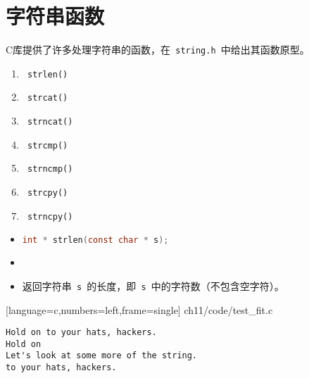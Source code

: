 \section{字符串函数}

\begin{frame}[fragile]\ft{\secname} 
C库提供了许多处理字符串的函数，在\lstinline| string.h |中给出其函数原型。
\begin{enumerate}
\item \lstinline| strlen() |
\item \lstinline| strcat() |
\item \lstinline| strncat() |
\item \lstinline| strcmp() |
\item \lstinline| strncmp()| 
\item \lstinline| strcpy() |
\item \lstinline| strncpy()|
\end{enumerate}
\end{frame}


\begin{frame}[fragile]
  \begin{itemize}
  \item {}
    \begin{lstlisting}[language=c,backgroundcolor=\color{red!20}]
int * strlen(const char * s);
    \end{lstlisting}
  \item    {}
  \item[] 返回字符串\lstinline| s |的长度，即\lstinline| s |中的字符数（不包含空字符）。
  \end{itemize}

\end{frame}

\begin{frame}

[language=c,numbers=left,frame=single]
{ch11/code/test_fit.c}
\end{frame}

\begin{frame}[fragile]
\begin{lstlisting}[backgroundcolor=\color{blue!20}]
Hold on to your hats, hackers.
Hold on
Let's look at some more of the string.
to your hats, hackers.
\end{lstlisting}
\end{frame}

